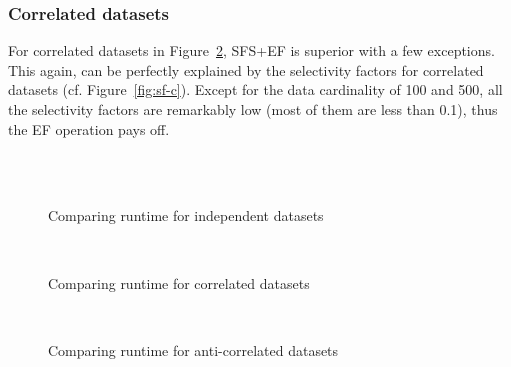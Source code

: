 \subsubsection{Correlated datasets}
For correlated datasets in Figure~\ref{fig:corre}, SFS+EF is superior
with a few exceptions. This again, can be perfectly explained by
the selectivity factors for correlated datasets (cf. Figure~\ref{fig:sf-c}).
Except for the data cardinality of 100 and 500, all
the selectivity factors are remarkably low (most of them are less than 0.1),
thus the EF operation pays off.

\begin{figure}[htbp]
\centering%
%
\hspace{\columnsep}%
\\
%
\hspace{\columnsep}%
\\
%
\caption{Comparing runtime for independent datasets}%
\label{fig:inde}%
\end{figure}

\begin{figure}[htbp]
\centering%
%
\hspace{\columnsep}%
\\
%
\hspace{\columnsep}%
%
\caption{Comparing runtime for correlated datasets}%
\label{fig:corre}%
\end{figure}


\begin{figure}[htbp]
\centering%
%
\hspace{\columnsep}%
\\
%
\hspace{\columnsep}%
%
\caption{Comparing runtime for anti-correlated datasets}%
\label{fig:anti}%
\end{figure}


